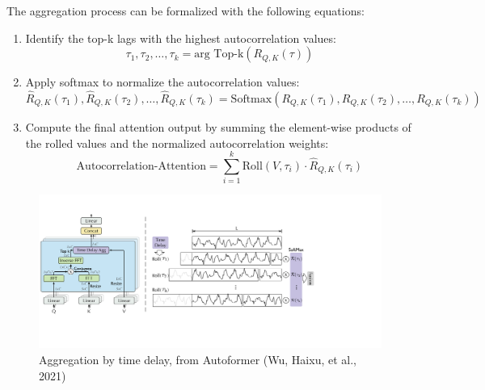 The aggregation process can be formalized with the following equations:

\begin{enumerate}
    \item Identify the top-k lags with the highest autocorrelation values:
    \begin{equation}
    \tau_1, \tau_2, \ldots, \tau_k = \text{arg Top-k}(R_{Q,K}(\tau))
    \end{equation}
    \item Apply softmax to normalize the autocorrelation values:
    \begin{equation}
    \hat{R}_{Q,K}(\tau_1), \hat{R}_{Q,K}(\tau_2), \ldots, \hat{R}_{Q,K}(\tau_k) = \text{Softmax}(R_{Q,K}(\tau_1), R_{Q,K}(\tau_2), \ldots, R_{Q,K}(\tau_k))
    \end{equation}
    \item Compute the final attention output by summing the element-wise products of the rolled values and the normalized autocorrelation weights:
    \begin{equation}
    \text{Autocorrelation-Attention} = \sum_{i=1}^{k} \text{Roll}(V, \tau_i) \cdot \hat{R}_{Q,K}(\tau_i)
    \end{equation}
\end{enumerate}

\begin{figure}[htbp]
    \centering
    \includegraphics[width=12cm]{3_ChapterTranformerVariants/figuras/TimeDelay.pdf}
    \caption{Aggregation by time delay, from Autoformer (Wu, Haixu, et al., 2021)\cite{wu2022autoformerdecompositiontransformersautocorrelation}}
    \end{figure}

